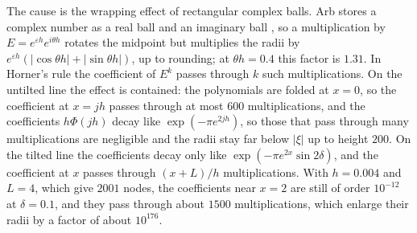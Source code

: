 The cause is the wrapping effect of rectangular complex balls. Arb stores a complex number as a real ball and an imaginary ball \cite{Arb}, so a multiplication by $E=e^{\varepsilon h}e^{i\theta h}$ rotates the midpoint but multiplies the radii by $e^{\varepsilon h}(|\cos\theta h|+|\sin\theta h|)$, up to rounding; at $\theta h=0.4$ this factor is $1.31$. In Horner's rule the coefficient of $E^k$ passes through $k$ such multiplications. On the untilted line the effect is contained: the polynomials are folded at $x=0$, so the coefficient at $x=jh$ passes through at most $600$ multiplications, and the coefficients $h\Phi(jh)$ decay like $\exp(-\pi e^{2jh})$, so those that pass through many multiplications are negligible and the radii stay far below $|\xi|$ up to height $200$. On the tilted line the coefficients decay only like $\exp(-\pi e^{2x}\sin2\delta)$, and the coefficient at $x$ passes through $(x+L)/h$ multiplications. With $h=0.004$ and $L=4$, which give $2001$ nodes, the coefficients near $x=2$ are still of order $10^{-12}$ at $\delta=0.1$, and they pass through about $1500$ multiplications, which enlarge their radii by a factor of about $10^{176}$.
